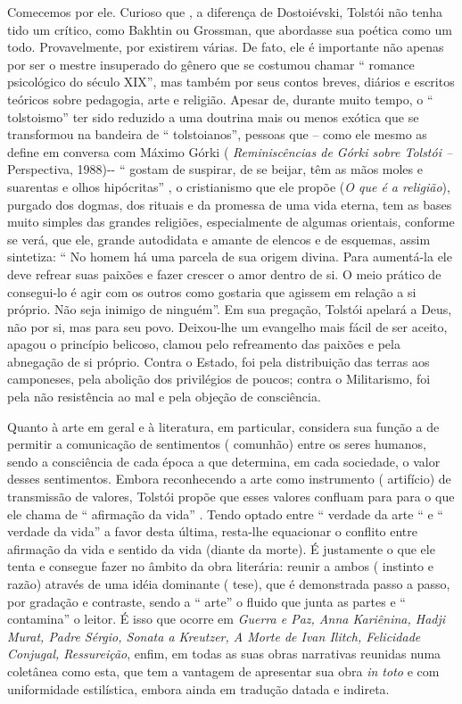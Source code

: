 Comecemos por ele. Curioso que , a diferença de Dostoiévski, Tolstói não
tenha tido um crítico, como Bakhtin ou Grossman, que abordasse sua
poética como um todo. Provavelmente, por existirem várias. De fato, ele
é importante não apenas por ser o mestre insuperado do gênero que se
costumou chamar `` romance psicológico do século XIX'', mas também por
seus contos breves, diários e escritos teóricos sobre pedagogia, arte e
religião. Apesar de, durante muito tempo, o `` tolstoismo'' ter sido
reduzido a uma doutrina mais ou menos exótica que se transformou na
bandeira de `` tolstoianos'', pessoas que -- como ele mesmo as define em
conversa com Máximo Górki ( \emph{Reminiscências de Górki sobre Tolstói
--} Perspectiva, 1988)-\/- `` gostam de suspirar, de se beijar, têm as
mãos moles e suarentas e olhos hipócritas'' , o cristianismo que ele
propõe (\emph{O que é a religião}), purgado dos dogmas, dos rituais e da
promessa de uma vida eterna, tem as bases muito simples das grandes
religiões, especialmente de algumas orientais, conforme se verá, que
ele, grande autodidata e amante de elencos e de esquemas, assim
sintetiza: `` No homem há uma parcela de sua origem divina. Para
aumentá-la ele deve refrear suas paixões e fazer crescer o amor dentro
de si. O meio prático de consegui-lo é agir com os outros como gostaria
que agissem em relação a si próprio. Não seja inimigo de ninguém''. Em
sua pregação, Tolstói apelará a Deus, não por si, mas para seu povo.
Deixou-lhe um evangelho mais fácil de ser aceito, apagou o princípio
belicoso, clamou pelo refreamento das paixões e pela abnegação de si
próprio. Contra o Estado, foi pela distribuição das terras aos
camponeses, pela abolição dos privilégios de poucos; contra o
Militarismo, foi pela não resistência ao mal e pela objeção de
consciência.

Quanto à arte em geral e à literatura, em particular, considera sua
função a de permitir a comunicação de sentimentos ( comunhão) entre os
seres humanos, sendo a consciência de cada época a que determina, em
cada sociedade, o valor desses sentimentos. Embora reconhecendo a arte
como instrumento ( artifício) de transmissão de valores, Tolstói propõe
que esses valores confluam para para o que ele chama de `` afirmação da
vida'' . Tendo optado entre `` verdade da arte `` e `` verdade da vida''
a favor desta última, resta-lhe equacionar o conflito entre afirmação da
vida e sentido da vida (diante da morte). É justamente o que ele tenta e
consegue fazer no âmbito da obra literária: reunir a ambos ( instinto e
razão) através de uma idéia dominante ( tese), que é demonstrada passo a
passo, por gradação e contraste, sendo a `` arte'' o fluido que junta as
partes e `` contamina'' o leitor. É isso que ocorre em \emph{Guerra e
Paz, Anna Kariênina, Hadji Murat, Padre Sérgio, Sonata a Kreutzer, A
Morte de Ivan Ilitch, Felicidade Conjugal, Ressureição}, enfim, em todas
as suas obras narrativas reunidas numa coletânea como esta, que tem a
vantagem de apresentar sua obra \emph{in toto} e com uniformidade
estilística, embora ainda em tradução datada e indireta.

